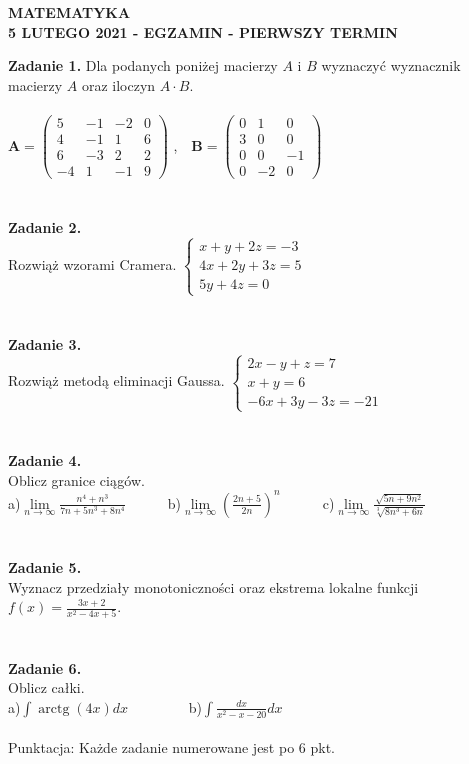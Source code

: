 \documentclass[12pt,a4paper]{report}
\begin{document}
\begin{center}

\textbf{MATEMATYKA \\5 LUTEGO 2021 - EGZAMIN - PIERWSZY TERMIN}

\end{center}\textbf{Zadanie 1.}  Dla podanych poniżej macierzy $A$ i $B$ wyznaczyć wyznacznik macierzy $A$ oraz iloczyn $A\cdot B$. \\\\ $ \mathbf{A} =\left( \begin{array}{cccc}5 & -1& -2 & 0\\4 & -1&1 & 6\\6 & -3& 2 & 2\\-4 & 1 & -1 & 9 \end{array} \right)$ ,\ \ $\mathbf{B} =\left( \begin{array}{ccc}0 & 1& 0\\3 & 0& 0\\0 & 0& -1\\0 & -2& 0\end{array} \right)$\\\\\\\textbf{Zadanie 2.} \\Rozwiąż wzorami Cramera. $\left\{ \begin{array}{ll}x+y+2z=-3\\4x+2y+3z=5\\5y+4z=0\end{array} \right.$\\\\\\\textbf{Zadanie 3.} \\Rozwiąż metodą eliminacji Gaussa. $\left\{ \begin{array}{ll}2x-y+z=7\\x+y=6\\-6x+3y-3z=-21\end{array} \right.$\\\\\\\textbf{Zadanie 4.}\\Oblicz granice ciągów.\\a)$\lim\limits_{n\to\infty}\frac{n^4+n^3}{7n+5n^3+8n^4}$\ \ \ \ \ \  b)$\lim\limits_{n\to \infty}(\frac{2n+5}{2n})^n$\ \ \ \ \ \ c)$\lim\limits_{n\to\infty} \frac{\sqrt{5n+9n^2}}{\sqrt[3]{8n^3+6n}}$\\\\\\\textbf{Zadanie 5.} \\Wyznacz przedziały monotoniczności oraz ekstrema lokalne funkcji $f(x)=\frac{3x+2}{x^2-4x+5}$.\\\\\\\textbf{Zadanie 6.} \\Oblicz całki. \\a)$\int \operatorname{arctg}(4x) dx$ \ \ \ \ \ \ \ \ b)$\int \frac{dx}{x^2-x-20} dx$\\\\Punktacja: Każde zadanie numerowane jest po 6 pkt.
\end{document}
